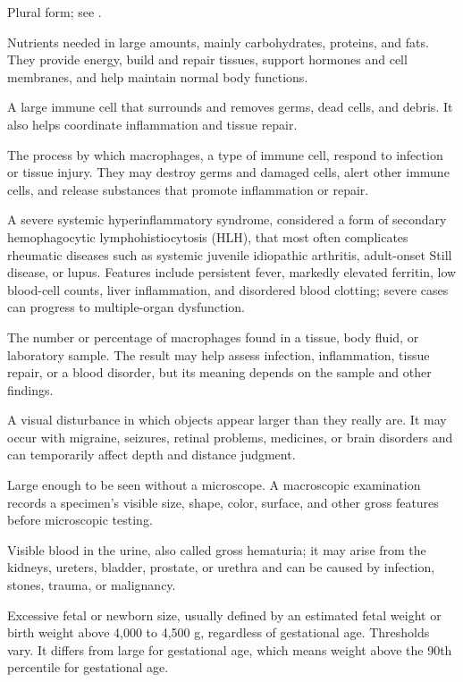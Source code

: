  Plural form; see .

 Nutrients needed in large amounts, mainly carbohydrates, proteins, and fats. They provide energy, build and repair tissues, support hormones and cell membranes, and help maintain normal body functions.

 A large immune cell that surrounds and removes germs, dead cells, and debris. It also helps coordinate inflammation and tissue repair.

 The process by which macrophages, a type of immune cell, respond to infection or tissue injury. They may destroy germs and damaged cells, alert other immune cells, and release substances that promote inflammation or repair.

 A severe systemic hyperinflammatory syndrome, considered a form of secondary hemophagocytic lymphohistiocytosis (HLH), that most often complicates rheumatic diseases such as systemic juvenile idiopathic arthritis, adult-onset Still disease, or lupus. Features include persistent fever, markedly elevated ferritin, low blood-cell counts, liver inflammation, and disordered blood clotting; severe cases can progress to multiple-organ dysfunction.

 The number or percentage of macrophages found in a tissue, body fluid, or laboratory sample. The result may help assess infection, inflammation, tissue repair, or a blood disorder, but its meaning depends on the sample and other findings.

 A visual disturbance in which objects appear larger than they really are. It may occur with migraine, seizures, retinal problems, medicines, or brain disorders and can temporarily affect depth and distance judgment.

 Large enough to be seen without a microscope. A macroscopic examination records a specimen’s visible size, shape, color, surface, and other gross features before microscopic testing.

 Visible blood in the urine, also called gross hematuria; it may arise from the kidneys, ureters, bladder, prostate, or urethra and can be caused by infection, stones, trauma, or malignancy.

 Excessive fetal or newborn size, usually defined by an estimated fetal weight or birth weight above 4,000 to 4,500 g, regardless of gestational age. Thresholds vary. It differs from large for gestational age, which means weight above the 90th percentile for gestational age.

